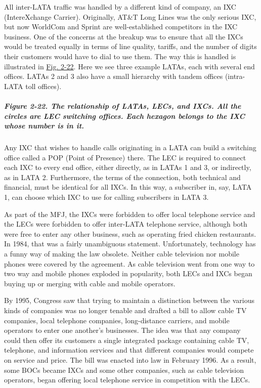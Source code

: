 All inter-LATA traffic was handled by a different kind of company, an
{IXC} ({IntereXchange Carrier}). Originally, AT\&T Long Lines was the
only serious IXC, but now WorldCom and Sprint are well-established
competitors in the IXC business. One of the concerns at the breakup was
to ensure that all the IXCs would be treated equally in terms of line
quality, tariffs, and the number of digits their customers would have to
dial to use them. The way this is handled is illustrated in
\protect\hyperlink{0130661023_ch02lev1sec5.htmlux5cux23ch02fig22}{Fig.
2-22}. Here we see three example LATAs, each with several end offices.
LATAs 2 and 3 also have a small hierarchy with tandem offices
(intra-LATA toll offices).

\subparagraph[Figure 2-22. The relationship of LATAs, LECs, and IXCs.
All the circles are LEC switching offices. Each hexagon belongs to the
IXC whose number is in
it.]{\texorpdfstring{\protect\hypertarget{0130661023_ch02lev1sec5.htmlux5cux23ch02fig22}{}{}Figure
2-22. The relationship of LATAs, LECs, and IXCs. All the circles are LEC
switching offices. Each hexagon belongs to the IXC whose number is in
it.}{Figure 2-22. The relationship of LATAs, LECs, and IXCs. All the circles are LEC switching offices. Each hexagon belongs to the IXC whose number is in it.}}


Any IXC that wishes to handle calls originating in a LATA can build a
switching office called a {POP} ({Point of Presence}) there. The LEC is
required to connect each IXC to every end office, either directly, as in
LATAs 1 and 3, or indirectly, as in LATA 2. Furthermore, the terms of
the connection, both technical and financial, must be identical for all
IXCs. In this way, a subscriber in, say, LATA 1, can choose which IXC to
use for calling subscribers in LATA 3.

As part of the MFJ, the IXCs were forbidden to offer local telephone
service and the LECs were forbidden to offer inter-LATA telephone
service, although both were free to enter any other business, such as
operating fried chicken restaurants. In 1984, that was a fairly
unambiguous statement. Unfortunately, technology has a funny way of
making the law obsolete. Neither cable television nor mobile phones were
covered by the agreement. As cable television went from one way to two
way and mobile phones exploded in popularity, both LECs and IXCs began
buying up or merging with cable and mobile operators.

By 1995, Congress saw that trying to maintain a distinction between the
various kinds of companies was no longer tenable and drafted a bill to
allow cable TV companies, local telephone companies, long-distance
carriers, and mobile operators to enter one another's businesses. The
idea was that any company could then offer its customers a single
integrated package containing cable TV, telephone, and information
services and that different companies would compete on service and
price. The bill was enacted into law in February 1996. As a result, some
BOCs became IXCs and some other companies, such as cable television
operators, began offering local telephone service in competition with
the LECs.

